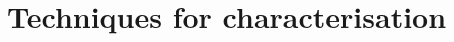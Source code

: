 
\chapter{Techniques for characterisation} %

\label{Chapter2} %


\newcommand{\keyword}[1]{\textbf{#1}}
\newcommand{\tabhead}[1]{\textbf{#1}}
\newcommand{\code}[1]{\texttt{#1}}
\newcommand{\file}[1]{\texttt{\bfseries#1}}
\newcommand{\option}[1]{\texttt{\itshape#1}}


